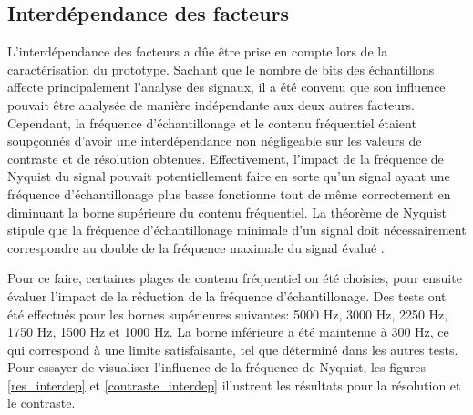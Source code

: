 \documentclass[11pt,letterpaper]{article}
\begin{document}




\subsection{Interdépendance des facteurs}
L'interdépendance des facteurs a dûe être prise en compte lors de la caractérisation du prototype. Sachant que le nombre
de bits des échantillons affecte principalement l'analyse des signaux, il a été convenu que son influence pouvait être analysée
de manière indépendante aux deux autres facteurs. Cependant, la fréquence d'échantillonage et le contenu fréquentiel étaient soupçonnés
d'avoir une interdépendance non négligeable sur les valeurs de contraste et de résolution obtenues. Effectivement, l'impact de la fréquence
de Nyquist du signal pouvait potentiellement faire en sorte qu'un signal ayant une fréquence d'échantillonage plus basse fonctionne tout de même 
correctement en diminuant la borne supérieure du contenu fréquentiel. La théorème de Nyquist stipule que la fréquence d'échantillonage
minimale d'un signal doit nécessairement correspondre au double de la fréquence maximale du signal évalué \cite{nyquist}. 

Pour ce faire, certaines plages de contenu fréquentiel on été choisies, pour ensuite évaluer l'impact de la réduction de la fréquence 
d'échantillonage. Des tests ont été effectués pour les bornes supérieures suivantes: 5000 Hz, 3000 Hz, 2250 Hz, 1750 Hz, 1500 Hz et 1000 Hz.
La borne inférieure a été maintenue à 300 Hz, ce qui correspond à une limite satisfaisante, tel que déterminé dans les autres tests. Pour essayer de visualiser
l'influence de la fréquence de Nyquist, les figures \ref{res_interdep} et \ref{contraste_interdep} illustrent les résultats pour la résolution et le contraste.
\end{document}
